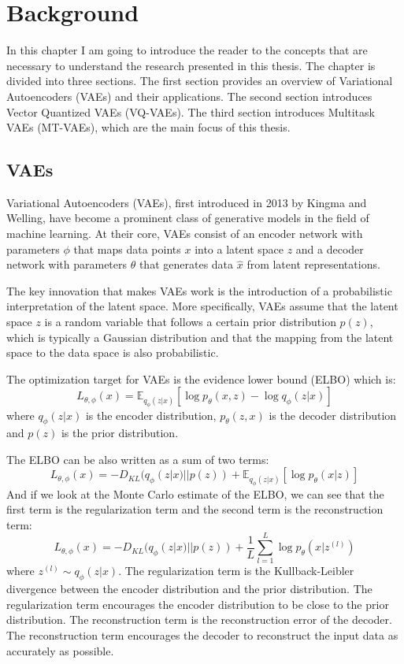 \chapter{Background}

In this chapter I am going to introduce the reader to the concepts that are necessary to understand the research presented in this thesis. The chapter is divided into three sections. The first section provides an overview of Variational Autoencoders (VAEs) and their applications. The second section introduces Vector Quantized VAEs (VQ-VAEs). The third section introduces Multitask VAEs (MT-VAEs), which are the main focus of this thesis.

\section{VAEs}

Variational Autoencoders (VAEs), first introduced in 2013 by Kingma and Welling\cite{kingma2013autoencoding}, have become a prominent class of generative models in the field of machine learning.  At their core, VAEs consist of an encoder network with parameters $\phi$ that maps data points $x$ into a latent space $z$ and a decoder network with parameters $\theta$ that generates data $\hat{x}$ from latent representations\cite{Kingma_2019}. 

The key innovation that makes VAEs work is the introduction of a probabilistic interpretation of the latent space. More specifically, VAEs assume that the latent space $z$ is a random variable that follows a certain prior distribution $p(z)$, which is typically a Gaussian distribution and that the mapping from the latent space to the data space is also probabilistic\cite{kingma2013autoencoding}.

The optimization target for VAEs is the evidence lower bound (ELBO) which is: \[ L_{\theta, \phi}(x) = \mathbb{E}_{q_{\phi}(z|x)} [\log p_{\theta}(x, z) - \log q_{\phi}(z|x)] \] where $q_{\phi}(z|x)$ is the encoder distribution, $p_{\theta}(z, x)$ is the decoder distribution and $p(z)$ is the prior distribution. 

The ELBO can be also written as a sum of two terms: \[ L_{\theta, \phi}(x) = - D_{KL}(q_{\phi}(z|x) || p(z)) + \mathbb{E}_{q_{\phi}(z|x)} [\log p_{\theta}(x|z)] \]
And if we look at the Monte Carlo estimate of the ELBO, we can see that the first term is the regularization term and the second term is the reconstruction term:
\[ L_{\theta, \phi}(x) = - D_{KL}(q_{\phi}(z|x) || p(z)) + \frac{1}{L} \sum_{l=1}^{L} \log p_{\theta}(x|z^{(l)}) \]
where $z^{(l)} \sim q_{\phi}(z|x)$. The regularization term is the Kullback-Leibler divergence between the encoder distribution and the prior distribution. The regularization term encourages the encoder distribution to be close to the prior distribution. The reconstruction term is the reconstruction error of the decoder. The reconstruction term encourages the decoder to reconstruct the input data as accurately as possible.

